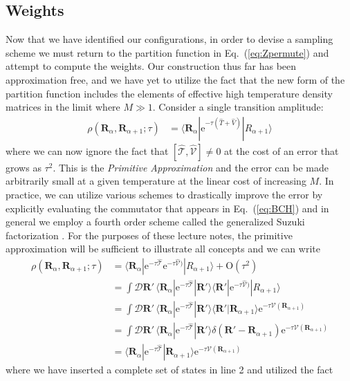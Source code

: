 \documentclass[prb,aps,amssym,nofootinbib,floatfix,notitlepage]{revtex4-1}
\renewcommand{\vec}[1]{\boldsymbol{#1}}
\newcommand{\e}[1]{\mathrm{e}^{#1}}
\renewcommand{\eqref}[1]{Eq.~(\ref{#1})}
\newcommand{\R}{\vec{R}}
\newcommand{\T}{\mathcal{T}}
\begin{document}
\subsection{Weights}
Now that we have identified our configurations, in order to devise a sampling
scheme we must return to the partition function in \eqref{eq:Zpermute} and
attempt to compute the weights.  Our construction thus far has been
approximation free, and we have yet to utilize the fact that the new form of
the partition function includes the elements of effective high temperature
density matrices in the limit where $M \gg 1$. Consider a single transition
amplitude:
%
\begin{align}
\rho(\R_\alpha, \R_{\alpha+1}; \tau) &= \langle \R_\alpha | \e{-\tau(\hat{T} +
\hat{V})}|R_{\alpha+1}\rangle
\end{align}
%
where we can now ignore the fact that $[\hat{\mathcal{T}},\hat{\mathcal{V}}]
\ne 0$ at the cost of an error that grows as $\tau^2$.  This is the
\emph{Primitive Approximation} and the error can be made arbitrarily small at a
given temperature at the linear cost of increasing $M$.  In practice, we can
utilize various schemes to drastically improve the error by explicitly
evaluating the commutator that appears in \eqref{eq:BCH} and in general we
employ a fourth order scheme called the generalized Suzuki factorization
\cite{Jang:2001cl}. For the purposes of these lecture notes, the primitive
approximation will be sufficient to illustrate all concepts and we can write
%
\begin{align}
    \rho(\R_\alpha, \R_{\alpha+1}; \tau) &= \langle \R_\alpha | 
    \e{-\tau\hat{\mathcal{T}}} \e{-\tau\hat{\mathcal{V}})}|R_{\alpha+1}\rangle + \mathrm{O}(\tau^2)
\nonumber \\
&= \int \mathcal{D}\R'\, \langle \R_\alpha | 
\e{-\tau\hat{\T}}|\R'\rangle \langle \R' | \e{-\tau\hat{\mathcal{V}})}|R_{\alpha+1}\rangle 
\nonumber \\
&= \int \mathcal{D}\R'\, \langle \R_\alpha | 
\e{-\tau\hat{\T}}|\R'\rangle \langle \R' |\R_{\alpha+1}\rangle \e{-\tau
\mathcal{V}(\R_{\alpha+1})} \nonumber \\
&= \int \mathcal{D}\R'\, \langle \R_\alpha | 
\e{-\tau\hat{\T}}|\R'\rangle \delta (\R'-\R_{\alpha+1}) \e{-\tau
\mathcal{V}(\R_{\alpha+1})} \nonumber \\
&=  \langle \R_\alpha | \e{-\tau\hat{\T}}|\R_{\alpha+1}\rangle  \e{-\tau
\mathcal{V}(\R_{\alpha+1})} 
\label{eq:rhoPrimitive}
\end{align}
%
where we have inserted a complete set of states in line 2 and utilized the fact
\end{document}
